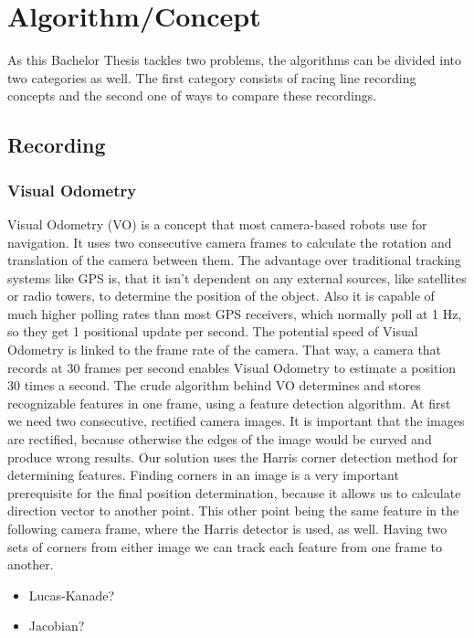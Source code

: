 \section{Algorithm/Concept}
\label{sec:algorithm}
\graphicspath{{utils/}}
As this Bachelor Thesis tackles two problems, the algorithms can be divided into two categories as well.
The first category consists of racing line recording concepts and the second one of ways to compare these recordings.

\subsection{Recording}
\subsubsection{Visual Odometry}
Visual Odometry (VO) is a concept that most camera-based robots use for navigation. It uses two consecutive camera frames to calculate the rotation and translation of the camera between them. The advantage over traditional tracking systems like GPS is, that it isn't dependent on any external sources, like satellites or radio towers, to determine the position of the object.
Also it is capable of much higher polling rates than most GPS receivers, which normally poll at 1 Hz, so they get 1 positional update per second. The potential speed of Visual Odometry is linked to the frame rate of the camera. That way, a camera that records at 30 frames per second enables Visual Odometry to estimate a position 30 times a second. 
The crude algorithm behind VO determines and stores recognizable features in one frame, using a feature detection algorithm.
At first we need two consecutive, rectified camera images. It is important that the images are rectified, because otherwise the edges of the image would be curved and produce wrong results.
Our solution uses the Harris corner detection method for determining features. Finding corners in an image is a very important prerequisite for the final position determination, because it allows us to calculate direction vector to another point. This other point being the same feature in the following camera frame, where the Harris detector is used, as well.
Having two sets of corners from either image we can track each feature from one frame to another. 
\begin{itemize}
    \item Lucas-Kanade?
    \item Jacobian?
\end{itemize}
